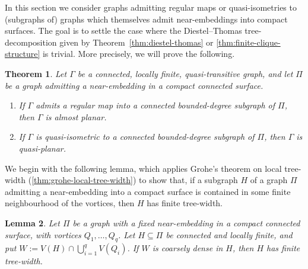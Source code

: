 \documentclass[10pt,a4paper]{amsart}
\newtheorem{theorem}{Theorem}[section]%
\newtheorem{lemma}[theorem]{Lemma}
\theoremstyle{definition}
\begin{document}
In this section we consider graphs admitting regular maps or quasi-isometries to (subgraphs of) graphs which themselves admit near-embeddings into compact surfaces. The goal is to settle the case where the Diestel--Thomas tree-decomposition given by Theorem~\ref{thm:diestel-thomas} or \ref{thm:finite-clique-structure} is trivial. More precisely, we will prove the following. 

\begin{theorem}\label{thm:escaping-vortex}
Let $\Gamma$ be a connected, locally finite, quasi-transitive graph, and let $\Pi$ be a graph admitting a near-embedding in a compact connected surface.
\begin{enumerate}
\item If $\Gamma$ admits a regular map into a connected bounded-degree subgraph of $\Pi$, then $\Gamma$ is almost planar.
\item If $\Gamma$ is quasi-isometric to a connected bounded-degree subgraph of $\Pi$, then $\Gamma$ is quasi-planar. 
\end{enumerate}
\end{theorem}


We begin with the following lemma, which applies Grohe's theorem on local tree-width (\ref{thm:grohe-local-tree-width}) to show that, if a subgraph $H$ of a graph $\Pi$  admitting a near-embedding into a compact surface is contained in some finite neighbourhood of the vortices, then $H$ has finite tree-width. 



\begin{lemma}\label{lem:dense-vortex-tree-width}
Let $\Pi$ be a graph with a fixed near-embedding in a compact connected surface, with vortices $Q_1,\ldots,Q_q$. Let $H\subseteq\Pi$ be connected and locally finite, and put $W:=V(H)\cap\bigcup_{i=1}^q V(Q_i)$. If $W$ is coarsely dense in $H$, then $H$ has finite tree-width.
\end{lemma}
\end{document}
